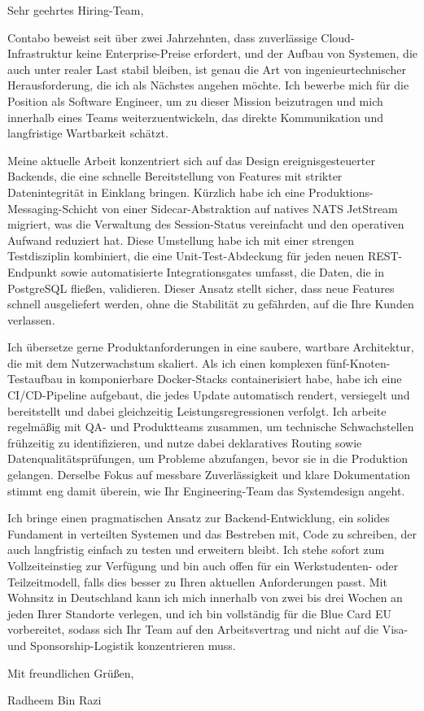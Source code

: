 \documentclass[11pt,a4paper]{coverletter}
\begin{document}
\clearpage
{}


\opening{Sehr geehrtes Hiring-Team,}

Contabo beweist seit über zwei Jahrzehnten, dass zuverlässige Cloud-Infrastruktur keine Enterprise-Preise erfordert, und der Aufbau von Systemen, die auch unter realer Last stabil bleiben, ist genau die Art von ingenieurtechnischer Herausforderung, die ich als Nächstes angehen möchte. Ich bewerbe mich für die Position als Software Engineer, um zu dieser Mission beizutragen und mich innerhalb eines Teams weiterzuentwickeln, das direkte Kommunikation und langfristige Wartbarkeit schätzt.

Meine aktuelle Arbeit konzentriert sich auf das Design ereignisgesteuerter Backends, die eine schnelle Bereitstellung von Features mit strikter Datenintegrität in Einklang bringen. Kürzlich habe ich eine Produktions-Messaging-Schicht von einer Sidecar-Abstraktion auf natives NATS JetStream migriert, was die Verwaltung des Session-Status vereinfacht und den operativen Aufwand reduziert hat. Diese Umstellung habe ich mit einer strengen Testdisziplin kombiniert, die eine Unit-Test-Abdeckung für jeden neuen REST-Endpunkt sowie automatisierte Integrationsgates umfasst, die Daten, die in PostgreSQL fließen, validieren. Dieser Ansatz stellt sicher, dass neue Features schnell ausgeliefert werden, ohne die Stabilität zu gefährden, auf die Ihre Kunden verlassen.

Ich übersetze gerne Produktanforderungen in eine saubere, wartbare Architektur, die mit dem Nutzerwachstum skaliert. Als ich einen komplexen fünf-Knoten-Testaufbau in komponierbare Docker-Stacks containerisiert habe, habe ich eine CI/CD-Pipeline aufgebaut, die jedes Update automatisch rendert, versiegelt und bereitstellt und dabei gleichzeitig Leistungsregressionen verfolgt. Ich arbeite regelmäßig mit QA- und Produktteams zusammen, um technische Schwachstellen frühzeitig zu identifizieren, und nutze dabei deklaratives Routing sowie Datenqualitätsprüfungen, um Probleme abzufangen, bevor sie in die Produktion gelangen. Derselbe Fokus auf messbare Zuverlässigkeit und klare Dokumentation stimmt eng damit überein, wie Ihr Engineering-Team das Systemdesign angeht.

Ich bringe einen pragmatischen Ansatz zur Backend-Entwicklung, ein solides Fundament in verteilten Systemen und das Bestreben mit, Code zu schreiben, der auch langfristig einfach zu testen und erweitern bleibt. Ich stehe sofort zum Vollzeiteinstieg zur Verfügung und bin auch offen für ein Werkstudenten- oder Teilzeitmodell, falls dies besser zu Ihren aktuellen Anforderungen passt. Mit Wohnsitz in Deutschland kann ich mich innerhalb von zwei bis drei Wochen an jeden Ihrer Standorte verlegen, und ich bin vollständig für die Blue Card EU vorbereitet, sodass sich Ihr Team auf den Arbeitsvertrag und nicht auf die Visa- und Sponsorship-Logistik konzentrieren muss.

\closing{Mit freundlichen Grüßen,}{Radheem Bin Razi}
\end{document}

